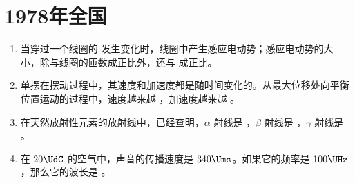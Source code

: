 \documentclass[\gkver]{gaokaozhenti}
\begin{document}
\chapter{1978年全国}

\begin{enumerate}
\item
当穿过一个线圈的  发生变化时，线圈中产生感应电动势；感应电动势的大小，除与线圈的匝数成正比外，还与  成正比。



\item
单摆在摆动过程中，其速度和加速度都是随时间变化的。从最大位移处向平衡位置运动的过程中，速度越来越 ，加速度越来越 。



\item
在天然放射性元素的放射线中，已经查明，$\alpha$ 射线是 ，$\beta$ 射线是 ，$\gamma$ 射线是 。



\item
在 $20\UdC$ 的空气中，声音的传播速度是 $340\Ums$。如果它的频率是 $100\UHz$，那么它的波长是 \tkanswer{$3.4\Um$}。


\end{enumerate}
\end{document}
